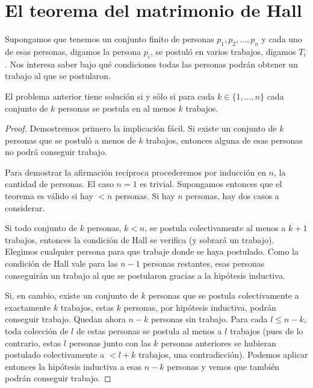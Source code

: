 \chapter{El teorema del matrimonio de Hall}
\label{matrimonio}

Supongamos que tenemos un conjunto finito de personas $p_1,p_2,\dots,p_n$ y cada uno de esas 
personas, digamos la persona $p_i$, se postuló en varios trabajos, digamos $T_i$. 
Nos interesa saber bajo qué condiciones todas 
las personas podrán obtener un trabajo al que se postularon. 

\begin{theorem}[Hall]
El problema anterior tiene solución si y sólo si para 
cada $k\in\{1,\dots,n\}$ cada conjunto de $k$ personas 
se postula en al menos $k$ trabajos.
\end{theorem}

\begin{proof}
    Demostremos primero la implicación fácil. Si existe un conjunto de $k$ personas que se postuló a menos de $k$ trabajos, entonces alguna de esas personas 
    no podrá conseguir trabajo. 
    
    Para demostrar la afirmación recíproca procederemos por 
    inducción en $n$, la cantidad de personas. El caso $n=1$ es trivial. Supongamos entonces que el teorema
    es válido si hay $<n$ personas. Si hay $n$ personas, hay dos casos a considerar. 
    
    Si todo conjunto de $k$ personas, $k<n$, se postula colectivamente al menos a $k+1$ trabajos, entonces la condición de Hall se verifica (y sobrará un trabajo). Elegimos
    cualquier persona para que trabaje donde se haya postulado. Como la condición de Hall vale para las $n-1$ personas restantes, esas personas conseguirán un trabajo al que se postularon 
    gracias a la hipótesis inductiva. 
    
    Si, en cambio, existe un conjunto de $k$ personas que se postula colectivamente a exactamente $k$ trabajos, estas $k$ personas, por hipótesis inductiva, podrán conseguir trabajo. 
    Quedan ahora $n-k$ personas sin trabajo. Para cada $l\leq n-k$, toda colección de $l$ de estas personas se postula al menos a $l$ trabajos 
    (pues de lo contrario, estas $l$ personas junto con las $k$ personas anteriores se hubieran postulado colectivamente a $<l+k$ trabajos, una contradicción). Podemos 
    aplicar entonces la hipótesis inductiva a esas $n-k$ personas y vemos que también podrán conseguir trabajo. 
\end{proof}

